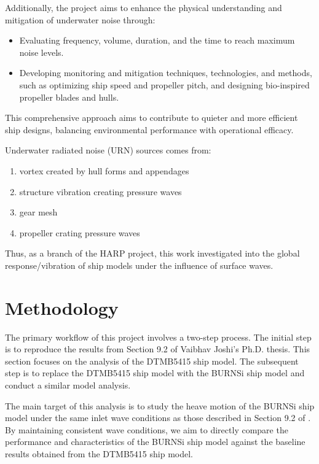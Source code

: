 \documentclass[12pt]{article} %
\begin{document}
Additionally, the project aims to enhance the physical understanding and mitigation of underwater 
noise through:

\begin{itemize}
    \item Evaluating frequency, volume, duration, and the time to reach maximum noise levels.
    \item Developing monitoring and mitigation techniques, technologies, and methods, such as 
    optimizing ship speed and propeller pitch, and designing bio-inspired propeller blades and hulls.
\end{itemize}

This comprehensive approach aims to contribute to quieter and more efficient ship designs, 
balancing environmental performance with operational efficacy.

Underwater radiated noise (URN) sources comes from:
\begin{enumerate}
    \item vortex created by hull forms and appendages
    \item structure vibration creating pressure waves
    \item gear mesh
    \item propeller crating pressure waves
\end{enumerate}
Thus, as a branch of the HARP project, this work investigated into the global response/vibration 
of ship models under the influence of surface waves. 




\newpage
\section{Methodology}
The primary workflow of this project involves a two-step process. The initial step is to reproduce 
the results from Section 9.2 of Vaibhav Joshi's Ph.D. thesis\cite{joshi2018}. This section focuses 
on the analysis of the DTMB5415 ship model. The subsequent step is to replace the DTMB5415 ship model 
with the BURNSi ship model and conduct a similar model analysis.

The main target of this analysis is to study the heave motion of the BURNSi ship model under the 
same inlet wave conditions as those described in Section 9.2 of \cite{joshi2018}. By maintaining 
consistent wave conditions, we aim to directly compare the performance and characteristics of the 
BURNSi ship model against the baseline results obtained from the DTMB5415 ship model.
\end{document}
